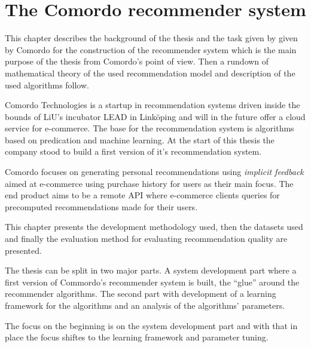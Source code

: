 
\chapter{The Comordo recommender system}\label{cha:recsys}

This chapter describes the background of the thesis and the task given by given by Comordo for the construction of the recommender system which is the main purpose of the thesis from Comordo's point of view. Then a rundown of mathematical theory of the used recommendation model and description of the used algorithms follow.


Comordo Technologies is a startup in recommendation systems driven inside the bounds of LiU's incubator LEAD in Linköping and will in the future offer a cloud service for e-commerce. The base for the recommendation system is algorithms based on predication and machine learning. At the start of this thesis the company stood to build a first version of it's recommendation system.

Comordo focuses on generating personal recommendations using \textit{implicit feedback} aimed at e-commerce using purchase history for users as their main focus. The end product aims to be a remote API where e-commerce clients queries for precomputed recommendations made for their users.


This chapter presents the development methodology used, then the datasets used and finally the evaluation method for evaluating recommendation quality are presented.

The thesis can be split in two major parts. A system development part where a first version of Commordo's recommender system is built, the ``glue'' around the recommender algorithms. The second part with development of a learning framework for the algorithms and an analysis of the algorithms' parameters.

The focus on the beginning is on the system development part and with that in place the focus shiftes to the learning framework and parameter tuning.









\newpage
